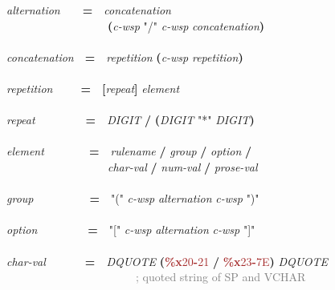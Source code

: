 \documentclass{article}
\renewcommand{\textsuperscript}[1]{\raisebox{0.8ex}{#1}}
\begin{document}
{\emph{alternation}\mbox{~~~~}\textbf{=}\mbox{~~}\emph{concatenation}\\
\mbox{~~~~~~~~~~~~~~~~~~}\textcolor{teal}{\emph{\textsuperscript{*}}}\textbf{(}\textcolor{teal}{\emph{\textsuperscript{*}}}\emph{c-{}wsp} \textcolor{BrickRed}{"/"} \textcolor{teal}{\emph{\textsuperscript{*}}}\emph{c-{}wsp} \emph{concatenation}\textbf{)}\\
\\
\emph{concatenation}\mbox{~~}\textbf{=}\mbox{~~}\emph{repetition} \textcolor{teal}{\emph{\textsuperscript{*}}}\textbf{(}\textcolor{teal}{\emph{\textsuperscript{1*}}}\emph{c-{}wsp} \emph{repetition}\textbf{)}\\
\\
\emph{repetition}\mbox{~~~~~}\textbf{=}\mbox{~~}\textbf{[}\emph{repeat}\textbf{]} \emph{element}\\
\\
\emph{repeat}\mbox{~~~~~~~~~}\textbf{=}\mbox{~~}\textcolor{teal}{\emph{\textsuperscript{1*}}}\emph{DIGIT} \textbf{/} \textbf{(}\textcolor{teal}{\emph{\textsuperscript{*}}}\emph{DIGIT} \textcolor{BrickRed}{"*"} \textcolor{teal}{\emph{\textsuperscript{*}}}\emph{DIGIT}\textbf{)}\\
\\
\emph{element}\mbox{~~~~~~~~}\textbf{=}\mbox{~~}\emph{rulename} \textbf{/} \emph{group} \textbf{/} \emph{option} \textbf{/}\\
\mbox{~~~~~~~~~~~~~~~~~~}\emph{char-{}val} \textbf{/} \emph{num-{}val} \textbf{/} \emph{prose-{}val}\\
\\
\emph{group}\mbox{~~~~~~~~~~}\textbf{=}\mbox{~~}\textcolor{BrickRed}{"("} \textcolor{teal}{\emph{\textsuperscript{*}}}\emph{c-{}wsp} \emph{alternation} \textcolor{teal}{\emph{\textsuperscript{*}}}\emph{c-{}wsp} \textcolor{BrickRed}{")"}\\
\\
\emph{option}\mbox{~~~~~~~~~}\textbf{=}\mbox{~~}\textcolor{BrickRed}{"["} \textcolor{teal}{\emph{\textsuperscript{*}}}\emph{c-{}wsp} \emph{alternation} \textcolor{teal}{\emph{\textsuperscript{*}}}\emph{c-{}wsp} \textcolor{BrickRed}{"]"}\\
\\
\emph{char-{}val}\mbox{~~~~~~~}\textbf{=}\mbox{~~}\emph{DQUOTE} \textcolor{teal}{\emph{\textsuperscript{*}}}\textbf{(}\textcolor{Brown}{\textbf{\%{}x}20\textbf{-}21} \textbf{/} \textcolor{Brown}{\textbf{\%{}x}23\textbf{-}7E}\textbf{)} \emph{DQUOTE}\\
\mbox{~~~~~~~~~~~~~~~~~~~~~~~}\textcolor{gray}{; quoted string of SP and VCHAR}\\
}
\end{document}
